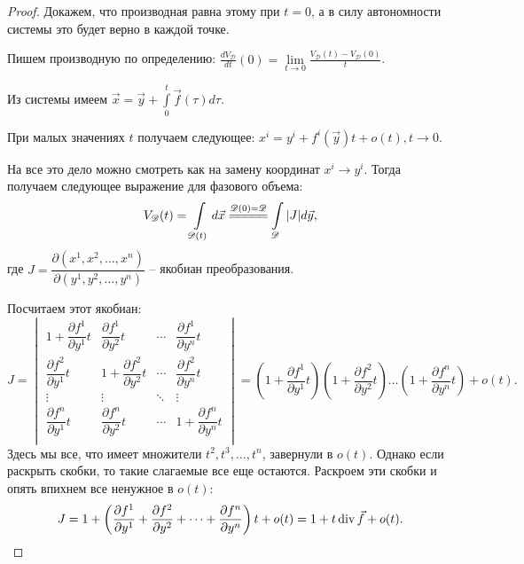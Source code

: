 	\begin{proof}
		Докажем, что производная равна этому при $t = 0$, а в силу автономности системы это будет верно в каждой точке.
		
		Пишем производную по определению: $\displaystyle \frac{dV_\mathscr{D}}{dt}(0) = \lim\limits_{t \rightarrow 0} \frac{V_\mathscr{D}(t) - V_\mathscr{D}(0)}{t}$.
		
		Из системы имеем $\displaystyle \vec{x} = \vec{y} + \int\limits_{0}^t \vec{f}(\tau)d\tau$.
		
		При малых значениях $t$ получаем следующее: $\displaystyle x^i = y^i + f^i(\vec{y})t + o(t), t\rightarrow 0$.
		
		На все это дело можно смотреть как на замену координат $x^i \longrightarrow y^i$. Тогда получаем следующее выражение для фазового объема:
		\begin{equation*}
			V_\mathscr{D}(t) = \int\limits_{\mathscr{D}(t)} d\vec{x} \stackrel{\mathscr{D}(0) = \mathscr{D}}{=\joinrel=\joinrel=\joinrel=\joinrel=} \int\limits_{\mathscr{D}} |J| d\vec{y},
		\end{equation*}
		где $J = \dfrac{\partial (x^1, x^2, \dots, x^n)}{\partial (y^1, y^2, \dots, y^n)}$ -- якобиан преобразования.
		
		Посчитаем этот якобиан:
		\begin{equation*}
			J = \begin{vmatrix}
				1 + \dfrac{\partial f^1}{\partial y^1}t & \dfrac{\partial f^1}{\partial y^2}t & \cdots & \dfrac{\partial f^1}{\partial y^n}t \\
				\dfrac{\partial f^2}{\partial y^1}t & 1 + \dfrac{\partial f^2}{\partial y^2}t & \cdots & \dfrac{\partial f^2}{\partial y^n}t \\
				\vdots & \vdots & \ddots & \vdots \\
				\dfrac{\partial f^n}{\partial y^1}t & \dfrac{\partial f^n}{\partial y^2}t & \cdots & 1 + \dfrac{\partial f^n}{\partial y^n}t \\
			\end{vmatrix} = \left(1 + \dfrac{\partial f^1}{\partial y^1}t\right)\left(1 + \dfrac{\partial f^2}{\partial y^2}t\right)\dots\left(1 + \dfrac{\partial f^n}{\partial y^n}t\right) + o(t).
		\end{equation*}
		Здесь мы все, что имеет множители $t^2, t^3, \dots, t^n$, завернули в $o(t)$. Однако если раскрыть скобки, то такие слагаемые все еще остаются. Раскроем эти скобки и опять впихнем все ненужное в $o(t)$:
		\begin{equation*}
			J = 1 + \left(\frac{\partial f^1}{\partial y^1} + \frac{\partial f^2}{\partial y^2} + \dots + \frac{\partial f^n}{\partial y^n}\right)t + o(t) = 1 + t\operatorname{div}\vec{f} + o(t).
		\end{equation*}
		

\end{proof}
